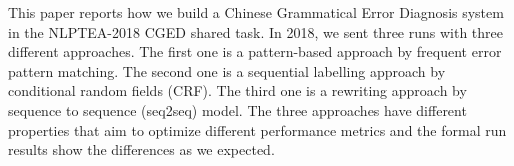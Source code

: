 This paper reports how we build a Chinese Grammatical Error Diagnosis system in the NLPTEA-2018 CGED shared task. In 2018, we sent three runs with three different approaches. The first one is a pattern-based approach by frequent error pattern matching. The second one is a sequential labelling approach by conditional random fields (CRF). The third one is a rewriting approach by sequence to sequence (seq2seq) model. The three approaches have different properties that aim to optimize different performance metrics and the formal run results show the differences as we expected.
